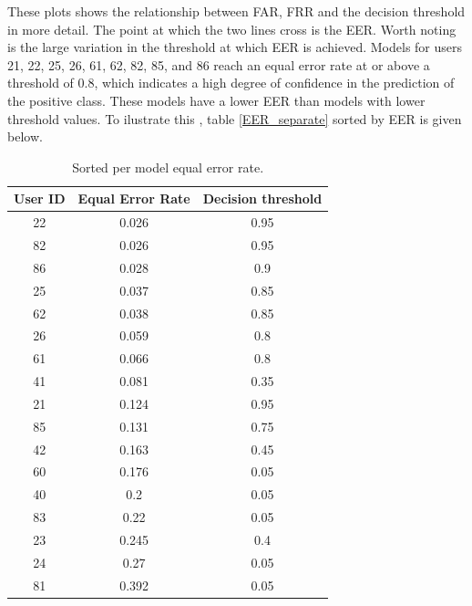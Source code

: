 These plots shows the relationship between FAR, FRR and the decision threshold in more detail. The point at which the two lines cross is the EER. Worth noting is the large variation in the threshold at which EER is achieved. Models for users 21, 22, 25, 26, 61, 62, 82, 85, and 86 reach an equal error rate at or above a threshold of 0.8, which indicates a high degree of confidence in the prediction of the positive class. These models have a lower EER than models with lower threshold values. To ilustrate this , table \ref{EER_separate} sorted by EER is given below.

\begin{center}
	\begin{table}[H]
		\begin{center}
			\begin{tabular}{ |c|c|c| } 
				\hline
				User ID & Equal Error Rate & Decision threshold \\
				\hline
				\hline
				22 & 0.026 & 0.95 \\
				\hline
				82 & 0.026 & 0.95 \\
				\hline
				86 & 0.028 & 0.9 \\
				\hline
				25 & 0.037 & 0.85 \\
				\hline
				62 & 0.038 & 0.85 \\
				\hline
				26 & 0.059 & 0.8 \\
				\hline
				61 & 0.066 & 0.8 \\
				\hline
				41 & 0.081 & 0.35 \\
				\hline
				21 & 0.124 & 0.95 \\
				\hline
				85 & 0.131 & 0.75 \\
				\hline
				42 & 0.163 & 0.45 \\
				\hline
				60 & 0.176 & 0.05 \\
				\hline
				40 & 0.2 & 0.05 \\
				\hline
				83 & 0.22 & 0.05 \\
				\hline
				23 & 0.245 & 0.4 \\
				\hline
				24 & 0.27 & 0.05 \\
				\hline
				81 & 0.392 & 0.05 \\
				\hline
			\end{tabular}
		\end{center}
		\caption{Sorted per model equal error rate.}
		\label{table:EER_separate_sorted}
	\end{table}
\end{center}

